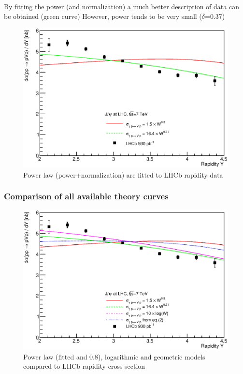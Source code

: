\documentclass[12pt]{article}
\begin{document}
By fitting the power (and normalization)
a much better description of data can be
obtained (green curve)
However, power tends to be very small ($\delta$=0.37)
\begin{figure}[!h]
\centering
 \includegraphics[width=.8\textwidth]{figures/dSigma_dy_comparison2.eps}
 \caption{Power law (power+normalization) are fitted to LHCb rapidity data}
\end{figure}

\clearpage
\subsubsection{Comparison of all available theory curves}
\begin{figure}[!h]
\centering
 \includegraphics[width=.8\textwidth]{figures/dSigma_dy_comparison3.eps}
 \caption{Power law (fitted and 0.8), logarithmic and geometric models compared to LHCb rapidity cross section}
\end{figure}
\end{document}
